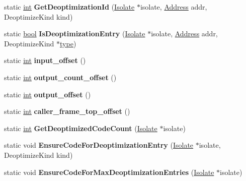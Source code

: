 \begin{DoxyCompactItemize}
static \mbox{\hyperlink{classint}{int}} {\bfseries Get\+Deoptimization\+Id} (\mbox{\hyperlink{classv8_1_1internal_1_1Isolate}{Isolate}} $\ast$isolate, \mbox{\hyperlink{classuintptr__t}{Address}} addr, Deoptimize\+Kind kind)
\item 
\mbox{\label{classv8_1_1internal_1_1Deoptimizer_aa963f63754f39c9b05aa8b360f06ad80}} 
static \mbox{\hyperlink{classbool}{bool}} {\bfseries Is\+Deoptimization\+Entry} (\mbox{\hyperlink{classv8_1_1internal_1_1Isolate}{Isolate}} $\ast$isolate, \mbox{\hyperlink{classuintptr__t}{Address}} addr, Deoptimize\+Kind $\ast$\mbox{\hyperlink{classstd_1_1conditional_1_1type}{type}})
\item 
\mbox{\label{classv8_1_1internal_1_1Deoptimizer_a596fc3bd6f8ae86360b9aecb5a240ce6}} 
static \mbox{\hyperlink{classint}{int}} {\bfseries input\+\_\+offset} ()
\item 
\mbox{\label{classv8_1_1internal_1_1Deoptimizer_a76a3faf66ccb1821e439a49f206b51bf}} 
static \mbox{\hyperlink{classint}{int}} {\bfseries output\+\_\+count\+\_\+offset} ()
\item 
\mbox{\label{classv8_1_1internal_1_1Deoptimizer_a210da11b9db7b0d1fab095ff6d9d122d}} 
static \mbox{\hyperlink{classint}{int}} {\bfseries output\+\_\+offset} ()
\item 
\mbox{\label{classv8_1_1internal_1_1Deoptimizer_a0bb7b04295b51b5a23c59e77dbc84c74}} 
static \mbox{\hyperlink{classint}{int}} {\bfseries caller\+\_\+frame\+\_\+top\+\_\+offset} ()
\item 
\mbox{\label{classv8_1_1internal_1_1Deoptimizer_a880004c229c7157a3d87ce9ea312f889}} 
static \mbox{\hyperlink{classint}{int}} {\bfseries Get\+Deoptimized\+Code\+Count} (\mbox{\hyperlink{classv8_1_1internal_1_1Isolate}{Isolate}} $\ast$isolate)
\item 
\mbox{\label{classv8_1_1internal_1_1Deoptimizer_a3a2d0b03a687fd56401dc0e3dcc5058c}} 
static void {\bfseries Ensure\+Code\+For\+Deoptimization\+Entry} (\mbox{\hyperlink{classv8_1_1internal_1_1Isolate}{Isolate}} $\ast$isolate, Deoptimize\+Kind kind)
\item 
\mbox{\label{classv8_1_1internal_1_1Deoptimizer_ada52e7aaad0d28536e4b4bb90106eb63}} 
static void {\bfseries Ensure\+Code\+For\+Max\+Deoptimization\+Entries} (\mbox{\hyperlink{classv8_1_1internal_1_1Isolate}{Isolate}} $\ast$isolate)
\end{DoxyCompactItemize}
